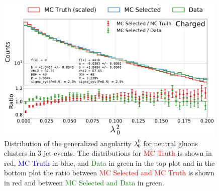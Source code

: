 \begin{figure}[h!]
  \centerfloat
  \includegraphics[width=0.99\textwidth, trim=0 0 0 0, clip, page=10]{figures/quarks/generalized_angularities_cha-down_sample=1.00-ML_vars=vertex-selection=b-ejet_min=4-n_iter_RS_lgb=99-n_iter_RS_xgb=9-cdot_cut=0.90-version=19.pdf}
  \caption[Generalized Angularities for Neutral Gluons Jets: $\lambda_0^0$]
          {Distribution of the generalized angularity $\lambda_0^0$ for neutral gluons clusters in 3-jet events. The distributions for \textcolor{red}{MC Truth} is shown in red, \textcolor{blue}{MC Truth} in blue, and \textcolor{green}{Data} in green in the top plot and in the bottom plot the ratio between \textcolor{red}{MC Selected and MC Truth} is shown in red and between \textcolor{green}{MC Selected and Data} in green. }
  \label{fig:q:generalized_angularities_neu_lambda_0_0}
\end{figure}











\FloatBarrier
\newpage

